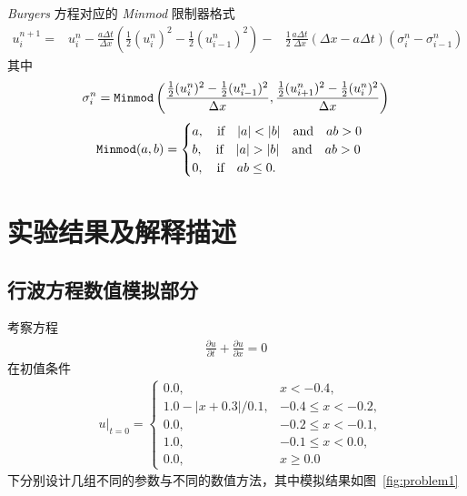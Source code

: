 \documentclass[10.5pt
]{article}
\begin{document}
\textit{Burgers} 方程对应的 \textit{Minmod} 限制器格式
\begin{equation}
\begin{aligned}
u_i^{n+1}=&
  u_i^n-\frac{a \Delta t}{\Delta x}\left( \frac{1}{2} (u_i^n)^2- \frac{1}{2} (u_{i-1}^n)^2 \right)-
 &\frac{1}{2} \frac{a \Delta t}{\Delta x}(\Delta x-a \Delta t)\left(\sigma_i^n-\sigma_{i-1}^n\right)
\end{aligned}
\end{equation}
其中
\begin{equation}
	\sigma_i^n = \verb|Minmod| \left( \frac{ \frac{1}{2} (u_i^n)^2 - \frac{1}{2} (u_{i-1}^{n})^2 }{ \Delta x }, \frac{ \frac{1}{2} (u_{i+1}^n)^2 - \frac{1}{2} (u_{i}^{n})^2}{ \Delta x } \right)
\end{equation}
\begin{equation}
	\verb|Minmod|(a, b) = 
	\begin{cases}
		a, \qif |a| < |b| \qand ab > 0\\
		b, \qif |a| > |b| \qand ab > 0\\
		0, \qif ab \leq 0.
	\end{cases}
\end{equation}


\section{实验结果及解释描述}
\subsection{行波方程数值模拟部分}
考察方程
\begin{align}
\frac{\partial u}{\partial t} + \frac{\partial u}{\partial x} = 0
\end{align}
在初值条件
\begin{align}
& u|_{t=0} = \left\{\begin{array}{ll} 0.0, & x < -0.4, \\
1.0 - |x + 0.3| / 0.1, & -0.4 \le x < -0.2, \\
0.0, & -0.2 \le x < -0.1, \\
1.0 , & -0.1 \le x < 0.0, \\
0.0, & x \ge 0.0
\end{array}\right.
\end{align}
下分别设计几组不同的参数与不同的数值方法，其中模拟结果如图~\ref{fig:problem1}
\end{document}
